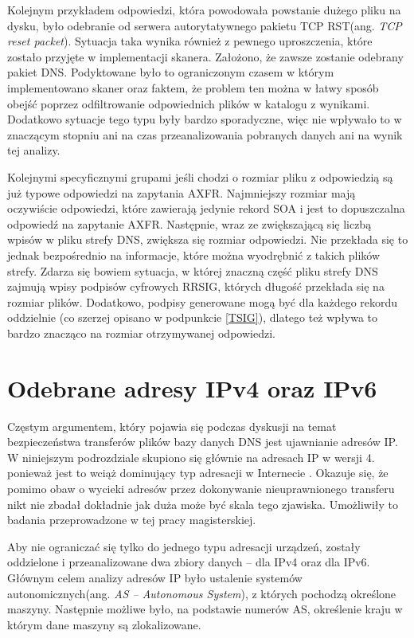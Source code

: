 Kolejnym przykładem odpowiedzi, która powodowała powstanie dużego pliku na dysku, było odebranie od serwera autorytatywnego pakietu
TCP RST(ang. \textit{TCP reset packet}). Sytuacja taka wynika również z pewnego uproszczenia, które zostało przyjęte w implementacji
skanera. Założono, że zawsze zostanie odebrany pakiet DNS. Podyktowane było to ograniczonym czasem w którym implementowano skaner
oraz faktem, że problem ten można w łatwy sposób obejść poprzez odfiltrowanie odpowiednich plików w katalogu z wynikami. Dodatkowo
sytuacje tego typu były bardzo sporadyczne, więc nie wpływało to w znaczącym stopniu ani na czas przeanalizowania pobranych danych
ani na wynik tej analizy.

Kolejnymi specyficznymi grupami jeśli chodzi o rozmiar pliku z odpowiedzią są już typowe odpowiedzi na zapytania AXFR.
Najmniejszy rozmiar mają oczywiście odpowiedzi, które zawierają jedynie rekord SOA i jest to dopuszczalna odpowiedź na zapytanie
AXFR. Następnie, wraz ze zwiększającą się liczbą wpisów w pliku strefy DNS, zwiększa się rozmiar odpowiedzi. Nie przekłada się to
jednak bezpośrednio na informacje, które można wyodrębnić z takich plików strefy. Zdarza się bowiem sytuacja, w której znaczną część
pliku strefy DNS zajmują wpisy podpisów cyfrowych RRSIG, których długość przekłada się na rozmiar plików. Dodatkowo, podpisy
generowane mogą być dla każdego rekordu oddzielnie (co szerzej opisano w podpunkcie \ref{TSIG}), dlatego też wpływa to bardzo
znacząco na rozmiar otrzymywanej odpowiedzi.

\section{Odebrane adresy IPv4 oraz IPv6}
\label{sec:adresy_ip}
Częstym argumentem, który pojawia się podczas dyskusji na temat bezpieczeństwa transferów plików bazy danych DNS jest ujawnianie
adresów IP. W niniejszym podrozdziale skupiono się głównie na adresach IP w wersji 4. ponieważ jest to wciąż dominujący typ adresacji
w Internecie \cite{Ipv6_deployment}. Okazuje się, że pomimo obaw o wycieki adresów przez dokonywanie nieuprawnionego transferu nikt nie
zbadał dokładnie jak duża może być skala tego zjawiska. Umożliwiły to badania przeprowadzone w tej pracy magisterskiej.

Aby nie ograniczać się tylko do jednego typu adresacji urządzeń, zostały oddzielone i przeanalizowane dwa zbiory danych -- dla IPv4
oraz dla IPv6. Głównym celem analizy adresów IP było ustalenie systemów autonomicznych(ang. \textit{AS -- Autonomous System}),
z których pochodzą określone maszyny. Następnie możliwe było, na podstawie numerów AS, określenie kraju w którym dane maszyny są
zlokalizowane.

